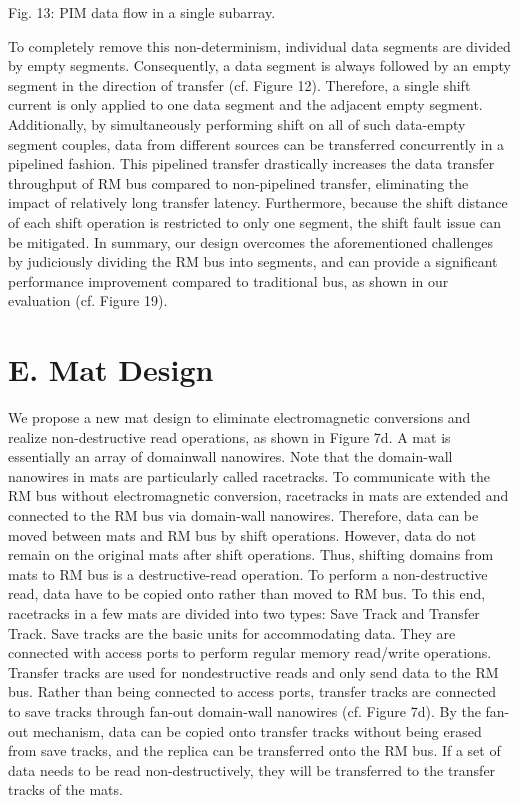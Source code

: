\documentclass[10pt]{article}
\begin{document}
Fig. 13: PIM data flow in a single subarray.

To completely remove this non-determinism, individual data segments are divided by empty segments. Consequently, a data segment is always followed by an empty segment in the direction of transfer (cf. Figure 12). Therefore, a single shift current is only applied to one data segment and the adjacent empty segment. Additionally, by simultaneously performing shift on all of such data-empty segment couples, data from different sources can be transferred concurrently in a pipelined fashion. This pipelined transfer drastically increases the data transfer throughput of RM bus compared to non-pipelined transfer, eliminating the impact of relatively long transfer latency. Furthermore, because the shift distance of each shift operation is restricted to only one segment, the shift fault issue can be mitigated. In summary, our design overcomes the aforementioned challenges by judiciously dividing the RM bus into segments, and can provide a significant performance improvement compared to traditional bus, as shown in our evaluation (cf. Figure 19).

\section*{E. Mat Design}
We propose a new mat design to eliminate electromagnetic conversions and realize non-destructive read operations, as shown in Figure 7d. A mat is essentially an array of domainwall nanowires. Note that the domain-wall nanowires in mats are particularly called racetracks. To communicate with the RM bus without electromagnetic conversion, racetracks in mats are extended and connected to the RM bus via domain-wall nanowires. Therefore, data can be moved between mats and RM bus by shift operations. However, data do not remain on the original mats after shift operations. Thus, shifting domains from mats to RM bus is a destructive-read operation. To perform a non-destructive read, data have to be copied onto rather than moved to RM bus. To this end, racetracks in a few mats are divided into two types: Save Track and Transfer Track. Save tracks are the basic units for accommodating data. They are connected with access ports to perform regular memory read/write operations. Transfer tracks are used for nondestructive reads and only send data to the RM bus. Rather than being connected to access ports, transfer tracks are connected to save tracks through fan-out domain-wall nanowires (cf. Figure 7d). By the fan-out mechanism, data can be copied onto transfer tracks without being erased from save tracks, and the replica can be transferred onto the RM bus. If a set of data needs to be read non-destructively, they will be transferred to the transfer tracks of the mats.
\end{document}
